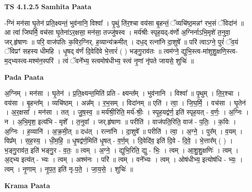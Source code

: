 \documentclass[17pt]{extarticle}
\begin{document}
\textbf{TS 4.1.2.5 } \newline
\textbf{Samhita Paata} \newline

-ग्निं मन॑सा घृ॒तेन॑ प्रति॒क्ष्यन्तं॒ भुव॑नानि॒ विश्वा᳚ । पृ॒थुं ति॑र॒श्चा वय॑सा बृ॒हन्तं॒ ॅव्यचि॑ष्ठ॒मन्नꣳ॑ रभ॒सं ॅविदा॑नं ॥ आ त्वा॑ जिघर्मि॒ वच॑सा घृ॒तेना॑ऽर॒क्षसा॒ मन॑सा॒ तज्जु॑षस्व । मर्य॑श्रीः स्पृह॒यद्-व॑र्णो अ॒ग्निर्नाऽभि॒मृशे॑ त॒नुवा॒ जर्.हृ॑षाणः ॥ परि॒ वाज॑पतिः क॒विर॒ग्निर्. ह॒व्यान्य॑क्रमीत् । दध॒द् रत्ना॑नि दा॒शुषे᳚ ॥ परि॑ त्वाऽग्ने॒ पुरं॑ ॅव॒यं ॅविप्रꣳ॑ सहस्य धीमहि । धृ॒षद् व॑र्णं दि॒वेदि॑वे भे॒त्तारं॑ ( ) भङ्गु॒राव॑तः ॥ त्वम॑ग्ने॒ द्युभि॒स्त्व-मा॑शुशु॒क्षणि॒स्त्व-म॒द्भ्यस्त्व-मश्म॑न॒स्परि॑ । त्वं ॅवने᳚भ्य॒ स्त्वमोष॑धीभ्य॒ स्त्वं नृ॒णां नृ॑पते जायसे॒ शुचिः॑ ॥ \newline

\textbf{Pada Paata} \newline

अ॒ग्निम् । मन॑सा । घृ॒तेन॑ । प्र॒ति॒क्ष्यन्त॒मिति॑ प्रति - क्ष्यन्त᳚म् । भुव॑नानि । विश्वा᳚ ॥ पृ॒थुम् । ति॒र॒श्चा । वय॑सा । बृ॒हन्त᳚म् । व्यचि॑ष्ठम् । अन्न᳚म् । र॒भ॒सम् । विदा॑नम् ॥ एति॑ । त्वा॒ । जि॒घ॒र्मि॒ । वच॑सा । घृ॒तेन॑ । अ॒र॒क्षसा᳚ । मन॑सा । तत् । जु॒ष॒स्व॒ ॥ मर्य॑श्री॒रिति॒ मर्य॑-श्रीः॒ । स्पृ॒ह॒यद्व॑र्ण॒ इति॑ स्पृह॒यत् - व॒र्णः॒ । अ॒ग्निः । न । अ॒भि॒मृश॒ इत्य॑भि - मृशे᳚ । त॒नुवा᳚ । जर्.हृ॑षाणः ॥ परीति॑ । वाज॑पति॒रिति॒ वाज॑ - प॒तिः॒ । क॒विः । अ॒ग्निः । ह॒व्यानि॑ । अ॒क्र॒मी॒त् ॥ दध॑त् । रत्ना॑नि । दा॒शुषे᳚ ॥ परीति॑ । त्वा॒ । अ॒ग्ने॒ । पुर᳚म् । व॒यम् । विप्र᳚म् । स॒ह॒स्य॒ । धी॒म॒हि॒ ॥ धृ॒षद्व॑र्ण॒मिति॑ धृ॒षत् - व॒र्ण॒म् । दि॒वेदि॑व॒ इति॑ दि॒वे - दि॒वे॒ । भे॒त्तार᳚म् ( ) । भ॒ङ्गु॒राव॑त॒ इति॑ भङ्गु॒र - व॒तः॒ ॥ त्वम् । अ॒ग्ने॒ । द्युभि॒रिति॒ द्यु - भिः॒ । त्वम् । आ॒शु॒शु॒क्षणिः॑ । त्वम् । अ॒द्भ्य इत्य॑त् - भ्यः । त्वम् । अश्म॑नः । परि॑ ॥ त्वम् । वने᳚भ्यः । त्वम् । ओष॑धीभ्य॒ इत्योष॑धि - भ्यः॒ । त्वम् । नृ॒णाम् । नृ॒प॒त॒ इति॑ नृ-प॒ते॒ । जा॒य॒से॒ । शुचिः॑ ॥  \newline


\textbf{Krama Paata} \newline
\end{document}
